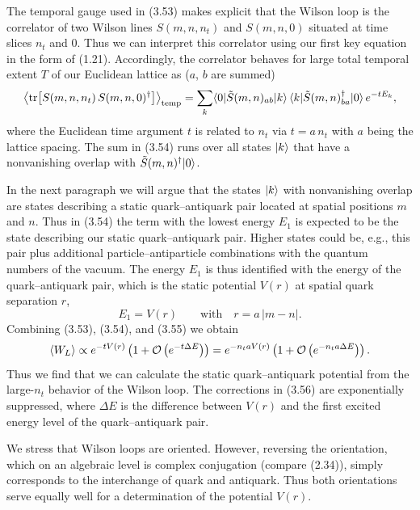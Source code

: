 The temporal gauge used in (3.53) makes explicit that the Wilson loop is the
correlator of two Wilson lines $S(m, n, n_t)$ and $S(m, n, 0)$ situated at time
slices $n_t$ and 0. Thus we can interpret this correlator using our first key
equation in the form of (1.21). Accordingly, the correlator behaves for large
total temporal extent $T$ of our Euclidean lattice as ($a$, $b$ are summed)
\begin{equation}
  \left\langle \operatorname{tr}\!\left[S(m, n, n_t)\,S(m, n, 0)^\dagger\right] \right\rangle_{\mathrm{temp}}
  = \sum_k \langle0|\tilde S(m,n)_{ab}|k\rangle\,
    \langle k|\tilde S(m,n)^\dagger_{ba}|0\rangle\, e^{-tE_k} ,
\end{equation}
where the Euclidean time argument $t$ is related to $n_t$ via $t = a\,n_t$ with
$a$ being the lattice spacing. The sum in (3.54) runs over all states $|k\rangle$
that have a nonvanishing overlap with $\tilde S(m,n)^\dagger|0\rangle$.

In the next paragraph we will argue that the states $|k\rangle$ with nonvanishing
overlap are states describing a static quark--antiquark pair located at spatial
positions $m$ and $n$. Thus in (3.54) the term with the lowest energy $E_1$ is
expected to be the state describing our static quark--antiquark pair. Higher
states could be, e.g., this pair plus additional particle--antiparticle
combinations with the quantum numbers of the vacuum. The energy $E_1$ is thus
identified with the energy of the quark--antiquark pair, which is the static
potential $V(r)$ at spatial quark separation $r$,
\begin{equation}
  E_1 = V(r) \qquad \text{with} \quad r = a\,|m - n| .
\end{equation}
Combining (3.53), (3.54), and (3.55) we obtain
\begin{equation}
  \left\langle W_L \right\rangle \propto e^{-tV(r)}\left(1 + \mathcal{O}\left(e^{-t\Delta E}\right)\right)
  = e^{-n_t a V(r)}\left(1 + \mathcal{O}\left(e^{-n_t a \Delta E}\right)\right) .
\end{equation}
Thus we find that we can calculate the static quark--antiquark potential from
the large-$n_t$ behavior of the Wilson loop. The corrections in (3.56) are
exponentially suppressed, where $\Delta E$ is the difference between $V(r)$ and
the first excited energy level of the quark--antiquark pair.

We stress that Wilson loops are oriented. However, reversing the orientation,
which on an algebraic level is complex conjugation (compare (2.34)), simply
corresponds to the interchange of quark and antiquark. Thus both orientations
serve equally well for a determination of the potential $V(r)$.

